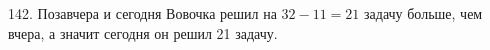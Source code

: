 142. Позавчера и сегодня Вовочка решил на $32-11=21$ задачу больше, чем вчера, а значит сегодня он решил 21 задачу.\\
